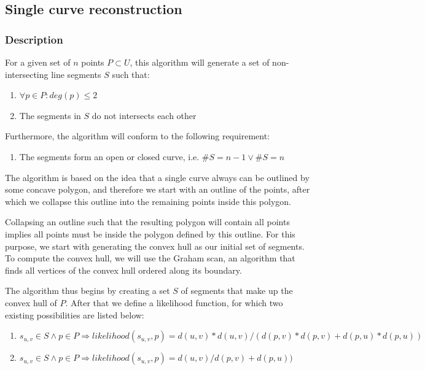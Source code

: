 \documentclass[11pt]{article}
\begin{document}
\subsection{Single curve reconstruction}
\subsubsection{Description}
For a given set of $n$ points $P \subset U$, this algorithm will generate a set of non-intersecting line segments $S$ such that:

\noindent\begin{enumerate}\topsep=0pt\itemsep=0pt\parsep=0pt
\item $\forall p \in P : deg(p) \leq 2$
\item The segments in $S$ do not intersects each other
\end{enumerate}

Furthermore, the algorithm will conform to the following requirement:

\noindent\begin{enumerate}\topsep=0pt\itemsep=0pt\parsep=0pt
\item The segments form an open or closed curve, i.e. $\#S = n-1 \vee \#S = n$
\end{enumerate}

The algorithm is based on the idea that a single curve always can be outlined by some concave polygon, and therefore we start with an outline of the points, after which we collapse this outline into the remaining points inside this polygon.

Collapsing an outline such that the resulting polygon will contain all points implies all points must be inside the polygon defined by this outline. For this purpose, we start with generating the convex hull as our initial set of segments. To compute the convex hull, we will use the Graham scan\cite{convex}, an algorithm that finds all vertices of the convex hull ordered along its boundary.

The algorithm thus begins by creating a set $S$ of segments that make up the convex hull of $P$. After that we define a likelihood function, for which two existing possibilities are listed below:

\noindent\begin{enumerate}\topsep=0pt\itemsep=0pt\parsep=0pt
\item $s_{u,v} \in S \wedge p \in P \Rightarrow likelihood(s_{u,v}, p) = d(u, v)*d(u, v)/(d(p, v)*d(p, v)+d(p, u)*d(p, u))$
\item $s_{u,v} \in S \wedge p \in P \Rightarrow likelihood(s_{u,v}, p) = d(u, v)/d(p, v)+d(p, u))$
\end{enumerate}
\end{document}
